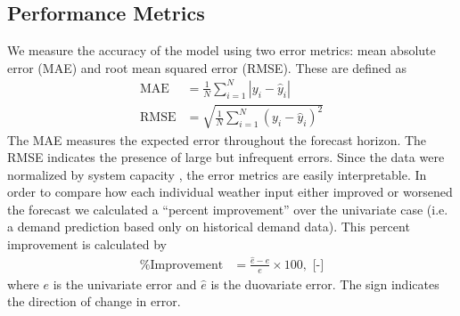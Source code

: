\subsection{Performance Metrics}
We measure the accuracy of the model using two error metrics:
mean absolute error (MAE) and root mean squared error (RMSE).
These are defined as
\begin{align}
  \text{MAE} &= \frac{1}{N}\sum_{i=1}^N\left|y_i - \hat{y}_i\right|\\
  \text{RMSE} &= \sqrt{\frac{1}{N}\sum_{i=1}^N\left(y_i - \hat{y}_i\right)^2}
\end{align}
The MAE measures the expected error throughout the forecast horizon. The RMSE
indicates the presence of large but infrequent errors. Since the data were
normalized by system capacity \cite{wang_quantifying_2016}, the error metrics
are easily interpretable.
In order to compare how each individual weather input either improved or
worsened the forecast we calculated a ``percent improvement'' over the
univariate case (i.e. a demand prediction based only on historical demand data).
This percent improvement is calculated by
\begin{align}
  \text{\% Improvement} &= \frac{\hat{e} - e}{e}\times 100, \text{ [-]}
\end{align}
where $e$ is the univariate error and $\hat{e}$ is the duovariate error. The
sign indicates the direction of change in error.
